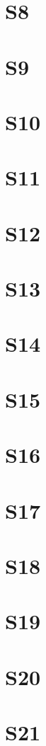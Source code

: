 \documentclass[12pt,a4paper]{report} %
\begin{document}
\section{S8}
\lipsum[9]
\section{S9}
\lipsum[10]
\section{S10}
\lipsum[11]
\section{S11}
\lipsum[12]
\section{S12}
\lipsum[13]
\section{S13}
\lipsum[14]
\section{S14}
\lipsum[15]
\section{S15}
\lipsum[16]
\section{S16}
\lipsum[17]
\section{S17}
\lipsum[18]
\section{S18}
\lipsum[19]
\section{S19}
\lipsum[20]
\section{S20}
\lipsum[21]
\section{S21}
\lipsum[22]
\end{document}
